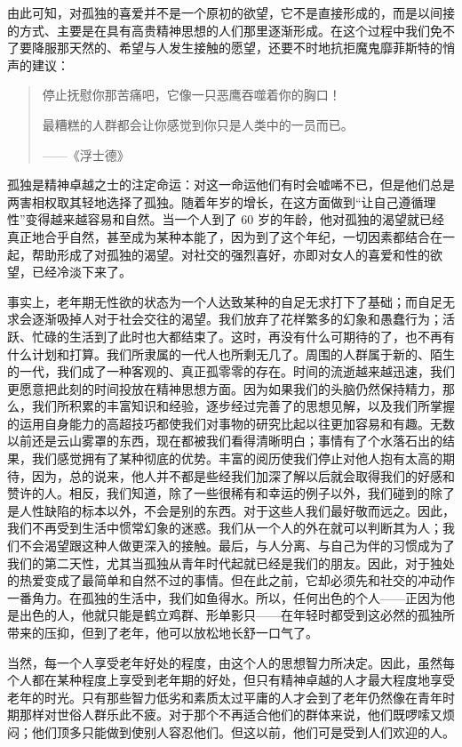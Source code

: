\documentclass[11pt,oneside]{article}
\begin{document}
\begin{common-format}
由此可知，对孤独的喜爱并不是一个原初的欲望，它不是直接形成的，而是以间接的方式、主要是在具有高贵精神思想的人们那里逐渐形成。在这个过程中我们免不了要降服那天然的、希望与人发生接触的愿望，还要不时地抗拒魔鬼靡菲斯特的悄声的建议： 

\begin{verse}
停止抚慰你那苦痛吧，它像一只恶鹰吞噬着你的胸口！ 

最糟糕的人群都会让你感觉到你只是人类中的一员而已。 

{\hfill ——《浮士德》 }
\end{verse}

孤独是精神卓越之士的注定命运：对这一命运他们有时会嘘唏不已，但是他们总是两害相权取其轻地选择了孤独。随着年岁的增长，在这方面做到“让自己遵循理性”变得越来越容易和自然。当一个人到了 60 岁的年龄，他对孤独的渴望就已经真正地合乎自然，甚至成为某种本能了，因为到了这个年纪，一切因素都结合在一起，帮助形成了对孤独的渴望。对社交的强烈喜好，亦即对女人的喜爱和性的欲望，已经冷淡下来了。 

事实上，老年期无性欲的状态为一个人达致某种的自足无求打下了基础；而自足无求会逐渐吸掉人对于社会交往的渴望。我们放弃了花样繁多的幻象和愚蠢行为；活跃、忙碌的生活到了此时也大都结束了。这时，再没有什么可期待的了，也不再有什么计划和打算。我们所隶属的一代人也所剩无几了。周围的人群属于新的、陌生的一代，我们成了一种客观的、真正孤零零的存在。时间的流逝越来越迅速，我们更愿意把此刻的时间投放在精神思想方面。因为如果我们的头脑仍然保持精力，那么，我们所积累的丰富知识和经验，逐步经过完善了的思想见解，以及我们所掌握的运用自身能力的高超技巧都使我们对事物的研究比起以往更加容易和有趣。无数以前还是云山雾罩的东西，现在都被我们看得清晰明白；事情有了个水落石出的结果，我们感觉拥有了某种彻底的优势。丰富的阅历使我们停止对他人抱有太高的期待，因为，总的说来，他人并不都是些经我们加深了解以后就会取得我们的好感和赞许的人。相反，我们知道，除了一些很稀有和幸运的例子以外，我们碰到的除了是人性缺陷的标本以外，不会是别的东西。对于这些人我们最好敬而远之。因此，我们不再受到生活中惯常幻象的迷惑。我们从一个人的外在就可以判断其为人；我们不会渴望跟这种人做更深入的接触。最后，与人分离、与自己为伴的习惯成为了我们的第二天性，尤其当孤独从青年时代起就已经是我们的朋友。因此，对于独处的热爱变成了最简单和自然不过的事情。但在此之前，它却必须先和社交的冲动作一番角力。在孤独的生活中，我们如鱼得水。所以，任何出色的个人——正因为他是出色的人，他就只能是鹤立鸡群、形单影只——在年轻时都受到这必然的孤独所带来的压抑，但到了老年，他可以放松地长舒一口气了。 

当然，每一个人享受老年好处的程度，由这个人的思想智力所决定。因此，虽然每个人都在某种程度上享受到老年期的好处，但只有精神卓越的人才最大程度地享受老年的时光。只有那些智力低劣和素质太过平庸的人才会到了老年仍然像在青年时期那样对世俗人群乐此不疲。对于那个不再适合他们的群体来说，他们既啰嗦又烦闷；他们顶多只能做到使别人容忍他们。但这以前，他们可是受到人们欢迎的人。 


\end{common-format}
\end{document}
